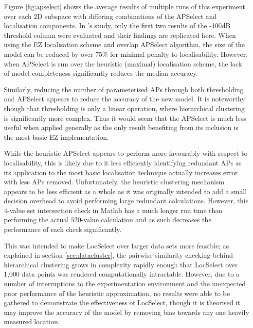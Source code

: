 \documentclass{UoYCSproject}
\begin{document}
                Figure \ref{fig:apselect} shows the average results of multiple runs of this experiment over each 2D subspace with differing combinations of the APSelect and localisation components. In \citeauthor{chintalapudi2010indoor}'s study, only the first two results of the -100dB threshold column were evaluated and their findings are replicated here. When using the EZ localisation scheme and overlap APSelect algorithm, the size of the model can be reduced by over 75\% for minimal penalty to localisability. However, when APSelect is run over the heuristic (maximal) localisation scheme, the lack of model completeness significantly reduces the median accuracy. 
                
                Similarly, reducing the number of parameterised APs through both thresholding and APSelect appears to reduce the accuracy of the new model. It is noteworthy though that thresholding is only a linear operation, where hierarchical clustering is significantly more complex. Thus it would seem that the APSelect is much less useful when applied generally as the only result benefiting from its inclusion is the most basic EZ implementation. 
                
                While the heuristic APSelect appears to perform more favourably with respect to localisability, this is likely due to it less efficiently identifying redundant APs as its application to the most basic localisation technique actually increases error with less APs removed. Unfortunately, the heuristic clustering mechanism appears to be less efficient as a whole as it was originally intended to add a small decision overhead to avoid performing large redundant calculations. However, this 4-value set intersection check in Matlab has a much longer run time than performing the actual 520-value calculation and as such decreases the performance of each check significantly.
                
                This was intended to make LocSelect over larger data sets more feasible; as explained in section \ref{sec:datacluster}, the pairwise similarity checking behind hierarchical clustering grows in complexity rapidly enough that LocSelect over 1,000 data points was rendered computationally intractable. However, due to a number of interruptions to the experimentation environment and the unexpected poor performance of the heuristic approximation, no results were able to be gathered to demonstrate the effectiveness of LocSelect, though it is theorised it may improve the accuracy of the model by removing bias towards any one heavily measured location.
        
\end{document}
